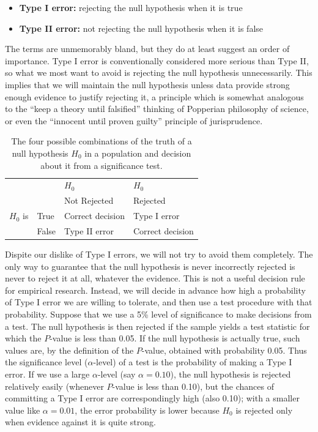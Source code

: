 \documentclass[11pt,a4paper,openany]{book}
\begin{document}
\begin{itemize}
\item
  \textbf{Type I error:} rejecting the null hypothesis when it is true
\item
  \textbf{Type II error:} not rejecting the null hypothesis when it is
  false
\end{itemize}

The terms are unmemorably bland, but they do at least suggest an order
of importance. Type I error is conventionally considered more serious
than Type II, so what we most want to avoid is rejecting the null
hypothesis unnecessarily. This implies that we will maintain the null
hypothesis unless data provide strong enough evidence to justify
rejecting it, a principle which is somewhat analogous to the ``keep a
theory until falsified'' thinking of Popperian philosophy of science, or
even the ``innocent until proven guilty'' principle of jurisprudence.

\begin{longtable}[]{@{}llll@{}}
\caption{\label{tab:t-twoerrors} The four possible combinations of the truth
of a null hypothesis \(H_{0}\) in a population and decision about it
from a significance test.}\tabularnewline
\toprule
& & \(H_{0}\) & \(H_{0}\)\tabularnewline
& & Not Rejected & Rejected\tabularnewline
\(H_{0}\) is & True & Correct decision & Type I error\tabularnewline
& False & Type II error & Correct decision\tabularnewline
\bottomrule
\end{longtable}

Dispite our dislike of Type I errors, we will not try to avoid them
completely. The only way to guarantee that the null hypothesis is never
incorrectly rejected is never to reject it at all, whatever the
evidence. This is not a useful decision rule for empirical research.
Instead, we will decide in advance how high a probability of Type I
error we are willing to tolerate, and then use a test procedure with
that probability. Suppose that we use a 5\% level of significance to
make decisions from a test. The null hypothesis is then rejected if the
sample yields a test statistic for which the \(P\)-value is less than
0.05. If the null hypothesis is actually true, such values are, by the
definition of the \(P\)-value, obtained with probability 0.05. Thus the
significance level (\(\alpha\)-level) of a test is the probability of
making a Type I error. If we use a large \(\alpha\)-level (say
\(\alpha=0.10\)), the null hypothesis is rejected relatively easily
(whenever \(P\)-value is less than 0.10), but the chances of committing
a Type I error are correspondingly high (also 0.10); with a smaller
value like \(\alpha=0.01\), the error probability is lower because
\(H_{0}\) is rejected only when evidence against it is quite strong.
\end{document}
